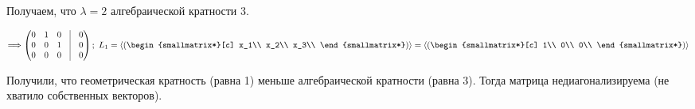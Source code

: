 Получаем, что $\lambda = 2$ алгебраической кратности 3.

$$\Longrightarrow
\begin{pmatrix}
0 & 1 & 0 & \vrule & 0\\
0 & 0 & 1 & \vrule & 0\\
0 & 0 & 0 & \vrule & 0\\
\end{pmatrix};
~L_1 = 
\langle
\left(
\begin{smallmatrix*}[c]
x_1\\ x_2\\ x_3\\ 
\end{smallmatrix*}
\right) 
\rangle=
\langle
\left(
\begin{smallmatrix*}[c]
1\\ 0\\ 0\\ 
\end{smallmatrix*}
\right) 
\rangle $$

Получили, что геометрическая кратность (равна 1) меньше алгебраической кратности (равна 3). Тогда матрица недиагонализируема (не хватило собственных векторов).    